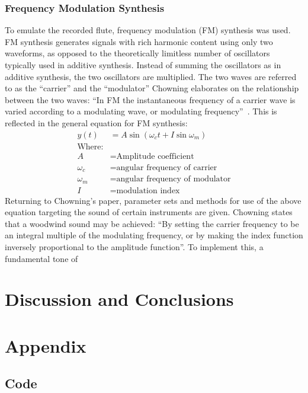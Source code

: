 \documentclass{article}
\begin{document}
        \subsubsection{Frequency Modulation Synthesis}
            To emulate the recorded flute, frequency modulation (FM) synthesis was used.
            FM synthesis generates signals with rich harmonic content using only two waveforms, as opposed to the theoretically limitless number of oscillators typically used in additive synthesis.
            Instead of summing the oscillators as in additive synthesis, the two oscillators are multiplied.
            The two waves are referred to as the ``carrier'' and the ``modulator''
            Chowning elaborates on the relationship between the two waves: ``In FM the instantaneous frequency of a carrier wave is varied according to a modulating wave, or modulating frequency''~\cite{chowning1973synthesis}.
            This is reflected in the general equation for FM synthesis:
            \begin{equation}
                \begin{split}
                    y(t) &= A\sin{(\omega_c t + I\sin{\omega_m})} \\
                    \text{Where:} \\
                    A &= \text{Amplitude coefficient} \\
                    \omega_c &= \text{angular frequency of carrier} \\
                    \omega_m &= \text{angular frequency of modulator} \\
                    I &= \text{modulation index}
                \end{split}
            \end{equation}
            Returning to Chowning's paper, parameter sets and methods for use of the above equation targeting the sound of certain instruments are given.
            Chowning states that a woodwind sound may be achieved: ``By setting the carrier frequency to be an integral multiple of the modulating frequency, or by making the index function inversely proportional to the amplitude function''.
            To implement this, a fundamental tone of







\section{Discussion and Conclusions}
\section{Appendix}
\subsection{Code}





\end{document}
